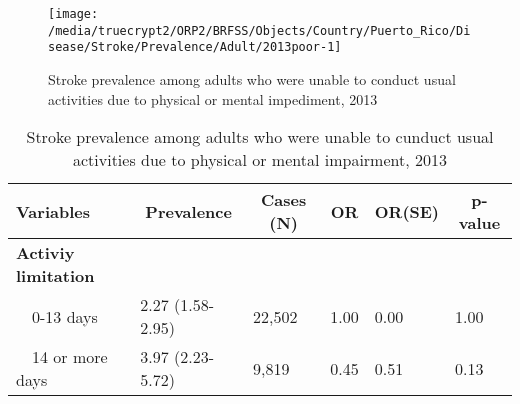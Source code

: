 \begin{figure}[H]
\caption{Stroke prevalence among adults who were unable to conduct usual activities due to physical or mental impediment, 2013}
\label{fig:poor.Stroke.2013}

\begin{knitrout}
\color{fgcolor}

{\centering \texttt{[image: /media/truecrypt2/ORP2/BRFSS/Objects/Country/Puerto\_Rico/Disease/Stroke/Prevalence/Adult/2013poor-1]} 

}



\end{knitrout}
\end{figure}

\begin{table}[H]
\caption{Stroke prevalence among adults who were unable to cunduct usual activities due to physical or mental impairment, 2013\label{tab:poor.Stroke.2013}} 
\begin{center}
\begin{tabular}{llllll}
\hline\hline
\multicolumn{1}{l}{Variables}&\multicolumn{1}{c}{Prevalence}&\multicolumn{1}{c}{Cases (N)}&\multicolumn{1}{c}{OR}&\multicolumn{1}{c}{OR(SE)}&\multicolumn{1}{c}{p-value}\tabularnewline
\hline
{\bfseries Activiy limitation}&&&&&\tabularnewline
~~0-13 days&2.27 (1.58-2.95)&22,502&1.00&0.00&1.00\tabularnewline
~~14 or more days&3.97 (2.23-5.72)& 9,819&0.45&0.51&0.13\tabularnewline
\hline
\end{tabular}\end{center}

\end{table}


